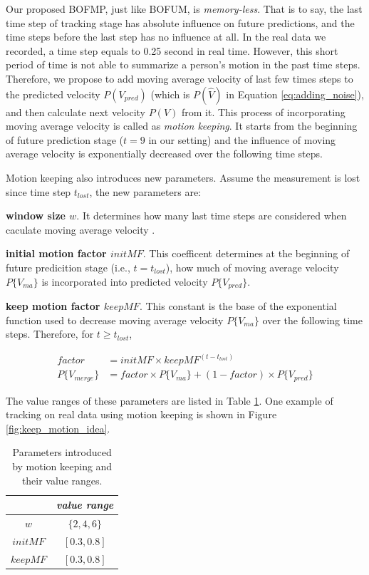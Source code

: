 Our proposed BOFMP, just like BOFUM, is \textit{memory-less}. That is to say, the last time step of tracking stage has absolute influence on future predictions, and the time steps before the last step has no influence at all. In the real data we recorded, a time step equals to 0.25 second in real time. However, this short period of time is not able to summarize a person's motion in the past time steps. Therefore, we propose to add moving average velocity of last few times steps to the predicted velocity $P(V_{pred})$ (which is $P(\hat{V})$ in Equation \ref{eq:adding_noise}), and then calculate next velocity $P(V)$ from it. This process of incorporating moving average velocity is called as \textit{motion keeping}. It starts from the beginning of future prediction stage ($t=9$ in our setting) and the influence of moving average velocity is exponentially decreased over the following time steps.

Motion keeping also introduces new parameters. Assume the measurement is lost since time step $t_{lost}$, the new parameters are: 
\begin{my_enumerate}
\item \textbf{window size $w$}. It determines how many last time steps are considered when caculate moving average velocity .
\item \textbf{initial motion factor \( initMF\)}. This coefficent determines at the beginning of future predicition stage (i.e., $t=t_{lost}$), how much of moving average velocity $P\{V_{ma}\}$ is incorporated into predicted velocity $P\{V_{pred}\}$. 
\item \textbf{keep motion factor \( keepMF \)}. This constant is the base of the exponential function used to decrease moving average velocity $P\{V_{ma}\}$ over the following time steps. Therefore, for $t \geq t_{lost}$, 

\begin{align}
factor &= initMF \times keepMF^{(t-t_{lost})} \\
P\{V_{merge}\} &= factor \times P\{V_{ma}\} + (1-factor) \times P\{V_{pred}\}
\end{align}

\end{my_enumerate}

The value ranges of these parameters are listed in Table \ref{table:motion_keeping_param_range}. One example of tracking on real data using motion keeping is shown in Figure \ref{fig:keep_motion_idea}.
\begin{table}[H]
\centering  
\begin{tabularx}{.3\textwidth}{c|c}
    \hline
      &  \textit{value range } \\ \hline
    $w$ & \( \{2, 4, 6\} \)  \\
     $initMF$ & \( [0.3, 0.8]\) \\  
     $keepMF$ & \( [0.3, 0.8]\) \\    
   \hline
  \end{tabularx}
\label{table:motion_keeping_param_range}
\caption{Parameters introduced by motion keeping and their value ranges.}
\end{table}


